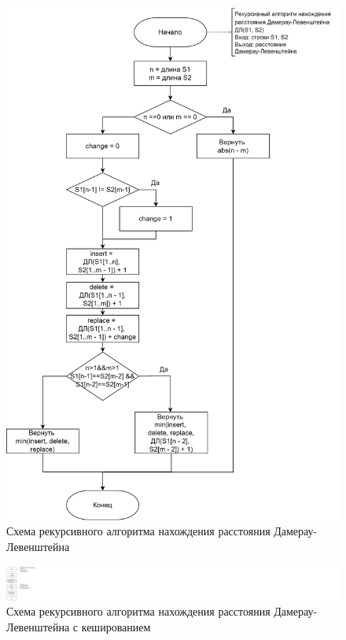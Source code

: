 \begin{figure}[h]
	\centering
	\includegraphics[height=0.8\textheight]{img/dlrec.png}
	\caption{Схема рекурсивного алгоритма нахождения расстояния Дамерау-Левенштейна}
	\label{fig:DLrec}
\end{figure}

\clearpage

\begin{figure}[h]
	\centering
	\includegraphics[height=0.6\textheight]{img/dlrechash-1.png}
	\caption{Схема рекурсивного алгоритма нахождения расстояния Дамерау-Левенштейна с кешированием}
	\label{fig:DLrechash1}
\end{figure}

